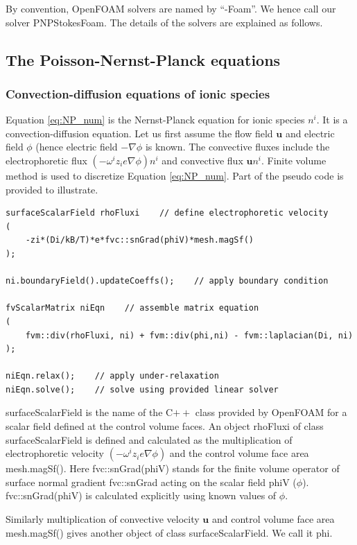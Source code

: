 By convention, OpenFOAM solvers are named by ``-Foam''. We hence call our solver PNPStokesFoam. The details of the solvers are explained as follows.

\subsection{The Poisson-Nernst-Planck equations}
\subsubsection{Convection-diffusion equations of ionic species}
Equation \ref{eq:NP_num} is the Nernst-Planck equation for ionic species $n^i$. It is a convection-diffusion equation. Let us first assume the flow field $\mathbf{u}$ and electric field $\phi$ (hence electric field $-\nabla\phi$ is known. The convective fluxes include the electrophoretic flux $(-\omega^iz_ie\nabla\phi)n^i$ and convective flux $\mathbf{u}n^i$. Finite volume method is used to discretize Equation \ref{eq:NP_num}. Part of the pseudo code is provided to illustrate.

\begin{lstlisting}
surfaceScalarField rhoFluxi    // define electrophoretic velocity
(
	-zi*(Di/kB/T)*e*fvc::snGrad(phiV)*mesh.magSf()
);

ni.boundaryField().updateCoeffs();    // apply boundary condition

fvScalarMatrix niEqn    // assemble matrix equation
(
    fvm::div(rhoFluxi, ni) + fvm::div(phi,ni) - fvm::laplacian(Di, ni)
);  
      
niEqn.relax();    // apply under-relaxation
niEqn.solve();    // solve using provided linear solver
\end{lstlisting}

\textsf{surfaceScalarField} is the name of the C$++$ class provided by OpenFOAM for a scalar field defined at the control volume faces. An object \textsf{rhoFluxi} of class \textsf{surfaceScalarField} is defined and calculated as the multiplication of electrophoretic velocity $(-\omega^iz_ie\nabla\phi)$ and the control volume face area \textsf{mesh.magSf()}. Here \textsf{fvc::snGrad(phiV)} stands for the finite volume operator of surface normal gradient \textsf{fvc::snGrad} acting on the scalar field \textsf{phiV} ($\phi$). \textsf{fvc::snGrad(phiV)} is calculated explicitly using known values of $\phi$. 

Similarly multiplication of convective velocity $\mathbf{u}$ and control volume face area \textsf{mesh.magSf()} gives another object of class \textsf{surfaceScalarField}. We call it \textsf{phi}.

